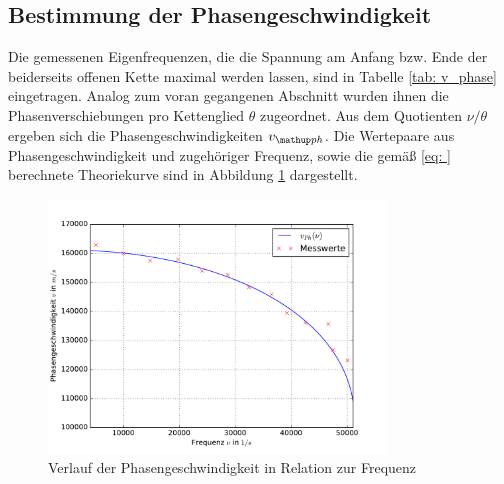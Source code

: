 \subsection{Bestimmung der Phasengeschwindigkeit}
Die gemessenen Eigenfrequenzen, die die Spannung am Anfang bzw. Ende der beiderseits
offenen Kette maximal werden lassen, sind in Tabelle \ref{tab: v_phase} eingetragen. Analog zum
voran gegangenen Abschnitt wurden ihnen die Phasenverschiebungen pro Kettenglied $\theta$
zugeordnet. Aus dem Quotienten $\nu / \theta$ ergeben sich die Phasengeschwindigkeiten $v\ua{ph}$.
Die Wertepaare aus Phasengeschwindigkeit und zugehöriger Frequenz, sowie die gemäß \eqref{eq: } berechnete
Theoriekurve sind in Abbildung \ref{fig: v_phase} dargestellt.

\begin{figure}
  \centering
  \includegraphics[width = 0.8\textwidth]{../Messdaten/plots/v_phase.pdf}
  \caption{Verlauf der Phasengeschwindigkeit in Relation zur Frequenz}
  \label{fig: v_phase}
\end{figure}


